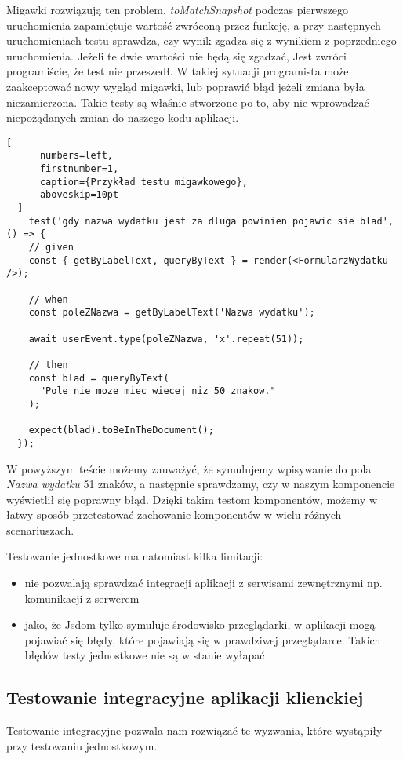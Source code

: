 \begin{description}
  Migawki rozwiązują ten problem. \emph{toMatchSnapshot} podczas pierwszego uruchomienia zapamiętuje wartość zwróconą przez funkcję, a przy następnych uruchomieniach testu sprawdza, czy wynik zgadza się z wynikiem z poprzedniego uruchomienia. Jeżeli te dwie wartości nie będą się zgadzać, Jest zwróci programiście, że test nie przeszedł. W takiej sytuacji programista może zaakceptować nowy wygląd migawki, lub poprawić błąd jeżeli zmiana była niezamierzona. Takie testy są właśnie stworzone po to, aby nie wprowadzać niepożądanych zmian do naszego kodu aplikacji.

\end{description}

  \begin{addmargin}[6mm]{0mm}
  \begin{lstlisting}[
      numbers=left,
      firstnumber=1,
      caption={Przykład testu migawkowego},
      aboveskip=10pt
  ]
    test('gdy nazwa wydatku jest za dluga powinien pojawic sie blad', () => {
    // given
    const { getByLabelText, queryByText } = render(<FormularzWydatku />);

    // when
    const poleZNazwa = getByLabelText('Nazwa wydatku');

    await userEvent.type(poleZNazwa, 'x'.repeat(51));

    // then
    const blad = queryByText(
      "Pole nie moze miec wiecej niz 50 znakow."
    );

    expect(blad).toBeInTheDocument();
  });
  \end{lstlisting}
  \end{addmargin}
  W powyższym teście możemy zauważyć, że symulujemy wpisywanie do pola \emph{Nazwa wydatku} 51 znaków, a następnie sprawdzamy, czy w naszym komponencie wyświetlił się poprawny błąd. Dzięki takim testom komponentów, możemy w łatwy sposób przetestować zachowanie komponentów w wielu różnych scenariuszach.

Testowanie jednostkowe ma natomiast kilka limitacji:
\begin{itemize}
  \item nie pozwalają sprawdzać integracji aplikacji z serwisami zewnętrznymi np. komunikacji z serwerem
  \item jako, że Jsdom tylko symuluje środowisko przeglądarki, w aplikacji mogą pojawiać się błędy, które pojawiają się w prawdziwej przeglądarce. Takich błędów testy jednostkowe nie są w stanie wyłapać
\end{itemize}

\subsection{Testowanie integracyjne aplikacji klienckiej}
Testowanie integracyjne pozwala nam rozwiązać te wyzwania, które wystąpiły przy testowaniu jednostkowym. 

